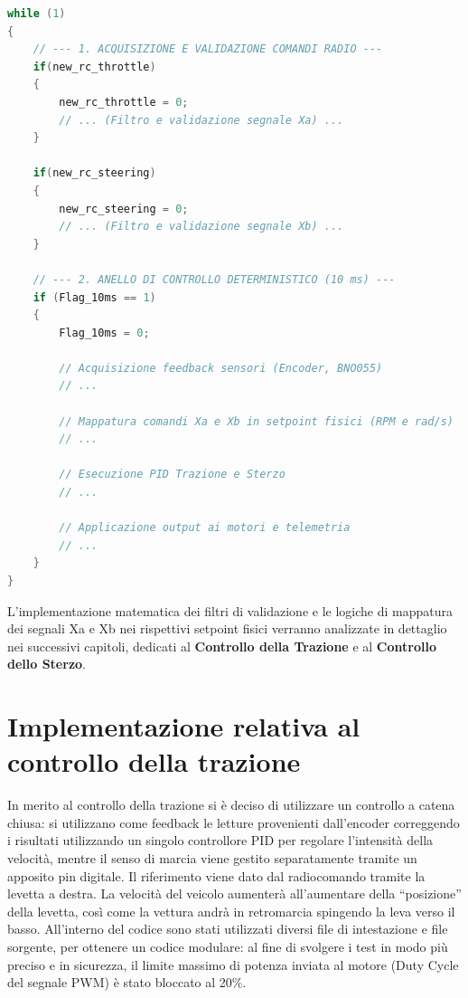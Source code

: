 \documentclass[11pt]{report}
\begin{document}
\begin{lstlisting}[language=Cpp, caption="Struttura a macro-blocchi del loop infinito principale"]
while (1)
{
    // --- 1. ACQUISIZIONE E VALIDAZIONE COMANDI RADIO ---
    if(new_rc_throttle)
    {
        new_rc_throttle = 0;
        // ... (Filtro e validazione segnale Xa) ...
    }

    if(new_rc_steering)
    {
        new_rc_steering = 0;
        // ... (Filtro e validazione segnale Xb) ...
    }

    // --- 2. ANELLO DI CONTROLLO DETERMINISTICO (10 ms) ---
    if (Flag_10ms == 1)
    {
        Flag_10ms = 0;

        // Acquisizione feedback sensori (Encoder, BNO055)
        // ...
        
        // Mappatura comandi Xa e Xb in setpoint fisici (RPM e rad/s)
        // ...

        // Esecuzione PID Trazione e Sterzo
        // ...
        
        // Applicazione output ai motori e telemetria
        // ...
    }
}
\end{lstlisting}
L'implementazione matematica dei filtri di validazione e le logiche di mappatura dei segnali Xa e Xb nei rispettivi setpoint fisici verranno analizzate in dettaglio nei successivi capitoli, 
dedicati al \textbf{Controllo della Trazione} e al \textbf{Controllo dello Sterzo}.

\section{Implementazione relativa al controllo della trazione}
\noindent In merito al controllo della trazione si è deciso di utilizzare un controllo a catena chiusa: si utilizzano come feedback le letture provenienti dall’encoder correggendo i risultati utilizzando un singolo controllore PID per regolare l'intensità della velocità, mentre il senso di marcia viene gestito separatamente tramite un apposito pin digitale. Il riferimento viene dato dal radiocomando tramite la levetta a destra. La velocità del veicolo aumenterà all’aumentare della “posizione” della levetta, così come la vettura andrà in retromarcia spingendo la leva verso il basso. All’interno del codice sono stati utilizzati diversi file di intestazione e file sorgente, per ottenere un codice modulare: al fine di svolgere i test in modo più preciso e in sicurezza, il limite massimo di potenza inviata al motore (Duty Cycle del segnale PWM) è stato bloccato al 20\%. 
\end{document}
